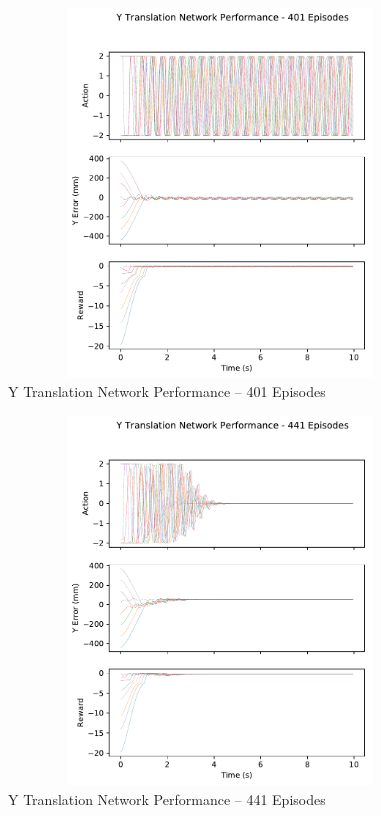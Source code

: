 \begin{figure}[H]
	\centering
	\includegraphics[width=6in, height=3.85in, keepaspectratio]{figures/train_figs/transy_transitions/2_401.pdf}
	\caption{Y Translation Network Performance -- 401 Episodes}
\end{figure}
\begin{figure}[H]
	\centering
	\includegraphics[width=6in, height=3.85in, keepaspectratio]{figures/train_figs/transy_transitions/2_441.pdf}
	\caption{Y Translation Network Performance -- 441 Episodes}
\end{figure}
